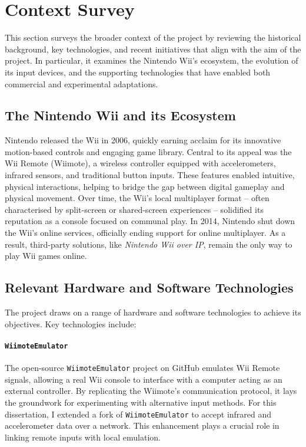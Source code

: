 \chapter{Context Survey}
\label{chapter:context}

This section surveys the broader context of the project by reviewing the historical background, key technologies, and recent initiatives that align with the aim of the project. In particular, it examines the Nintendo Wii’s ecosystem, the evolution of its input devices, and the supporting technologies that have enabled both commercial and experimental adaptations.

\section{The Nintendo Wii and its Ecosystem}
Nintendo released the Wii in 2006, quickly earning acclaim for its innovative motion-based controls and engaging game library. Central to its appeal was the Wii Remote (Wiimote), a wireless controller equipped with accelerometers, infrared sensors, and traditional button inputs. These features enabled intuitive, physical interactions, helping to bridge the gap between digital gameplay and physical movement. Over time, the Wii’s local multiplayer format -- often characterised by split-screen or shared-screen experiences -- solidified its reputation as a console focused on communal play. In 2014, Nintendo shut down the Wii’s online services\cite{nintendoTerminationNintendo}, officially ending support for online multiplayer. As a result, third-party solutions, like \textit{Nintendo Wii over IP}, remain the only way to play Wii games online.

\section{Relevant Hardware and Software Technologies}
The project draws on a range of hardware and software technologies to achieve its objectives. Key technologies include:

\subsubsection{\texttt{WiimoteEmulator}\cite{wiimote_emulator}}
The open-source \texttt{WiimoteEmulator} project on GitHub emulates Wii Remote signals, allowing a real Wii console to interface with a computer acting as an external controller. By replicating the Wiimote’s communication protocol, it lays the groundwork for experimenting with alternative input methods. For this dissertation, I extended a fork of \texttt{WiimoteEmulator} to accept infrared and accelerometer data over a network. This enhancement plays a crucial role in linking remote inputs with local emulation.


